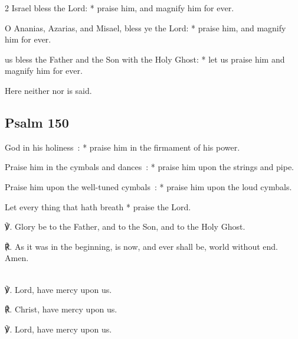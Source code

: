 \begin{multicols}{2}
 Israel bless the Lord: * praise him, and magnify him for ever.\par
{}
O Ananias, Azarias, and Misael, bless ye the Lord: * praise him, and magnify him for ever.

     us bless the Father and the Son with the Holy Ghost: * let us praise him and magnify him for ever.\par

\begin{rubric}
	Here neither  nor  is said.
\end{rubric}

\subsection{Psalm 150}

 God in his holiness~: * praise him in the firmament of his power.\par
{}
Praise him in the cymbals and dances~: * praise him upon the strings and pipe.\par
{}Praise him upon the well-tuned cymbals~: * praise him upon the loud cymbals.\par
{}Let every thing that hath breath * praise the Lord.\par
℣. Glory be to the Father, and to the Son, and to the Holy Ghost.\par
℟. As it was in the beginning, is now, and ever shall be, world without end. Amen.

\\

℣. Lord, have mercy upon us.

℟. Christ, have mercy upon us.

℣. Lord, have mercy upon us.


\end{multicols}
